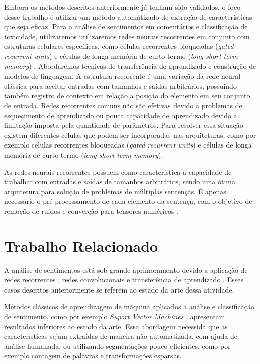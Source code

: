 \documentclass[12pt]{article}
\begin{document}
Embora os métodos descritos anteriormente já tenham sido validados, o foco desse trabalho é utilizar um método automátizado de extração de características que seja eficaz. Para a análise de sentimentos em comentários e classificação de toxicidade, utilizaremos utilizaremos redes neurais recorrentes em conjunto com estruturas celulares específicas, como células recorrentes bloqueadas (\textit{gated recurrent units}) \cite{DBLP:journals/corr/PascanuGCB13} e células de longa memória de curto termo (\textit{long-short term memory}) \cite{sep:97}. Abordaremos técnicas de transferência de aprendizado e construção de modelos de linguagem.
A estrutura recorrente é uma variação da rede neural clássica para aceitar entradas com tamanhos e saídas arbitrários, possuindo também registro de contexto em relação a posição do elemento em seu conjunto de entrada. Redes recorrentes comuns não são efetivas devido a problemas de esquecimento de aprendizado ou pouca capacidade de aprendizado devido a limitação imposta pela quantidade de parâmetros. Para resolver essa situação existem diferentes células que podem ser incorporadas nas arquiteturas, como por exemplo células recorrentes bloqueadas (\textit{gated recurrent units}) e células de longa memória de curto termo (\textit{long-short term memory}).

As redes neurais recorrentes possuem como característica a capacidade de trabalhar com entradas e saídas de tamanhos arbitrários, sendo uma ótima arquitetura para solução de problemas de múltiplas sentenças. É apenas necessário o pré-processamento de cada elemento da sentença, com o objetivo de remoção de ruídos e converção para tensores numéricos \cite{karpathy:2015}.


\section{Trabalho Relacionado} \label{sec:relacionado}

A análise de sentimentos está sob grande aprimoramento devido a aplicação de redes recorrentes \cite{karpathy:2015}, redes convolucionais \cite{lecun:98} e transferência de aprendizado \cite{DBLP:journals/corr/abs-1801-06146}. Esses casos descritos anteriormente se referem ao estado da arte dessa atividade.

Métodos clássicos de aprendizagem de máquina aplicados a análise e classificação de sentimento, como por exemplo \textit{Suport Vector Machines} \cite{DBLP:journals/ml/CortesV95}, apresentam resultados inferiores ao estado da arte. Essa abordagem necessida que as características sejam extraídas de maneira não automátizada, com ajuda de análise humanada, ou utilizando segmentações pouco eficientes, como por exemplo contagem de palavras e transformações esparsas.
\end{document}
